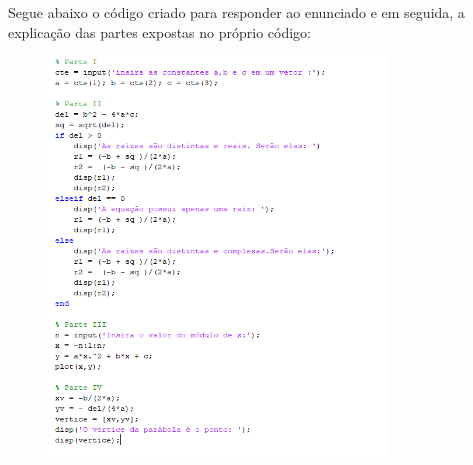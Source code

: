 \documentclass[12pt]{article}
\begin{document}
Segue abaixo o código criado para responder ao enunciado e em seguida, a explicação das partes expostas no próprio código:

\begin{figure}[H]
    \begin{center}
        \includegraphics[width=0.8\textwidth]{questao1png.png}
        \label{questao 1}
    \end{center}
\end{figure}
\end{document}
